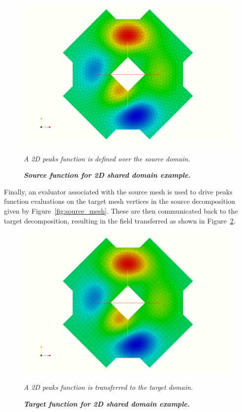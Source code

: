 \documentclass[letterpaper,12pt]{article}
\begin{document}
\begin{figure}[htpb!]
  \centering \includegraphics[width=5.5in]{tri_peaks.png}
  \caption{\bf \sl Source function for 2D shared domain example.}{\sl
    A 2D peaks function is defined over the source domain.}
  \label{fig:source_field}
\end{figure}

Finally, an evaluator associated with the source mesh is used to drive
peaks function evaluations on the target mesh vertices in the source
decomposition given by Figure~\ref{fig:source_mesh}. These are then
communicated back to the target decomposition, resulting in the field
transferred as shown in Figure~\ref{fig:target_field}.

\begin{figure}[htpb!]
  \centering
  \includegraphics[width=5.5in]{quad_peaks.png}
  \caption{\bf \sl Target function for 2D shared domain example.}{\sl
    A 2D peaks function is transferred to the target domain.}
  \label{fig:target_field}
\end{figure}
\end{document}

